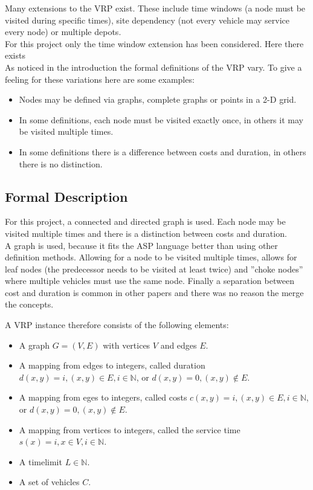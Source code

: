 \documentclass[12pt, letterpaper]{article}
\begin{document}
Many extensions to the VRP exist. These include time windows (a node must be visited during specific times), site dependency (not every vehicle may service every node) or multiple depots.\\
For this project only the time window extension has been considered. Here there exists \\

As noticed in the introduction the formal definitions of the VRP vary. To give a feeling for these variations here are some examples:
\begin{itemize}
	\item Nodes may be defined via graphs, complete graphs or points in a 2-D grid.
	\item In some definitions, each node must be visited exactly once, in others it may be visited multiple times.
	\item In some definitions there is a difference between costs and duration, in others there is no distinction.
\end{itemize}

\subsection{Formal Description}
For this project, a connected and directed graph is used. Each node may be visited multiple times and there is a distinction between costs and duration.\\
A graph is used, because it fits the ASP language better than using other definition methods. Allowing for a node to be visited multiple times, allows for leaf nodes (the predecessor needs to be visited at least twice) and ''choke nodes'' where multiple vehicles must use the same node. Finally a separation between cost and duration is common in other papers and there was no reason the merge the concepts.

A VRP instance therefore consists of the following elements:
\begin{itemize}
	\item A graph $G = (V,E)$ with vertices $V$ and edges $E$.
	\item A mapping from edges to integers, called duration $d(x,y) = i, (x,y) \in E, i \in \mathbb{N}$, or $d(x,y) = 0, (x,y) \notin E$.
	\item A mapping from eges to integers, called costs $c(x,y) = i, (x,y) \in E, i \in \mathbb{N}$, or $d(x,y) = 0, (x,y) \notin E$.
	\item A mapping from vertices to integers, called the service time $s(x) = i, x \in V, i \in \mathbb{N}$.
	\item A timelimit $L \in \mathbb{N}$.
	\item A set of vehicles $C$.
\end{itemize}
\end{document}
